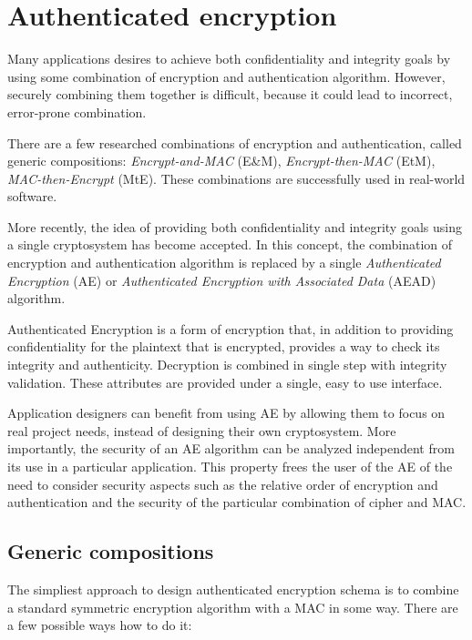 \section{Authenticated encryption}
\label{toc/authenticated-encryption}

Many applications desires to achieve both confidentiality and integrity goals by using some combination of encryption and authentication algorithm. However, securely combining them together is difficult, because it could lead to incorrect, error-prone combination.

There are a few researched combinations of encryption and authentication, called generic compositions: \textit{Encrypt-and-MAC} (E\&M), \textit{Encrypt-then-MAC} (EtM), \textit{MAC-then-Encrypt} (MtE). These combinations are successfully used in real-world software.

More recently, the idea of providing both confidentiality and integrity goals using a single cryptosystem has become accepted. In this concept, the combination of encryption and authentication algorithm is replaced by a single \textit{Authenticated Encryption} (AE) or \textit{Authenticated Encryption with Associated Data} (AEAD) algorithm. \cite{aead}

Authenticated Encryption is a form of encryption that, in addition to providing confidentiality for the plaintext that is encrypted, provides a way to check its integrity and authenticity. Decryption is combined in single step with integrity validation. These attributes are provided under a single, easy to use interface.

Application designers can benefit from using AE by allowing them to focus on real project needs, instead of designing their own cryptosystem. More importantly, the security of an AE algorithm can be analyzed independent from its use in a particular application. This property frees the user of the AE of the need to consider security aspects such as the relative order of encryption and authentication and the security of the particular combination of cipher and MAC.


\subsection{Generic compositions}
\label{toc/generic-compositions}



The simpliest approach to design authenticated encryption schema is to combine a standard symmetric encryption algorithm with a MAC in some way. There are a few possible ways how to do it:


